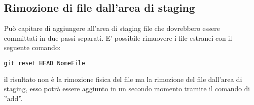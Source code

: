 \subsection{Rimozione di file dall'area di staging}
Può capitare di aggiungere all'area di staging file che dovrebbero essere committati in due passi separati. E' possibile rimuovere i file estranei con il seguente comando:

\begin{center}
\texttt{git reset HEAD NomeFile}
\end{center}

il risultato non è la rimozione fisica del file ma la rimozione del file dall'area di staging, esso potrà essere aggiunto in un secondo momento tramite il comando di ''add''.